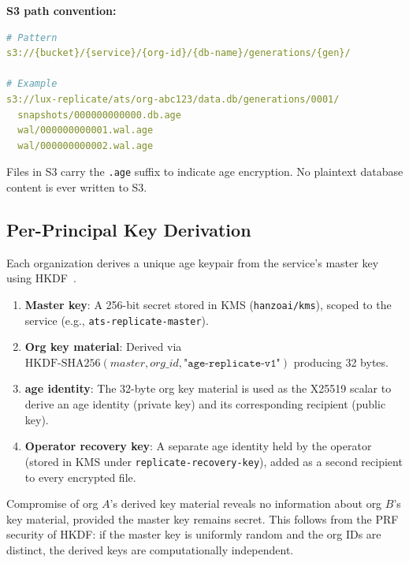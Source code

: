 \noindent\textbf{S3 path convention:}

\begin{lstlisting}[language=YAML,caption={S3 path structure.}]
# Pattern
s3://{bucket}/{service}/{org-id}/{db-name}/generations/{gen}/

# Example
s3://lux-replicate/ats/org-abc123/data.db/generations/0001/
  snapshots/000000000000.db.age
  wal/000000000001.wal.age
  wal/000000000002.wal.age
\end{lstlisting}

Files in S3 carry the \texttt{.age} suffix to indicate age encryption.
No plaintext database content is ever written to S3.

\subsection{Per-Principal Key Derivation}\label{sec:keys}

Each organization derives a unique age keypair from the service's
master key using HKDF~\cite{rfc5869}.

\begin{definition}\label{def:keyhier}
\begin{enumerate}[nosep]
  \item \textbf{Master key}: A 256-bit secret stored in KMS
    (\texttt{hanzoai/kms}), scoped to the service (e.g.,
    \texttt{ats-replicate-master}).
  \item \textbf{Org key material}: Derived via
    $\mathrm{HKDF\text{-}SHA256}(\mathit{master}, \mathit{org\_id}, \texttt{"age-replicate-v1"})$
    producing 32 bytes.
  \item \textbf{age identity}: The 32-byte org key material is used
    as the X25519 scalar to derive an age identity (private key) and
    its corresponding recipient (public key).
  \item \textbf{Operator recovery key}: A separate age identity held
    by the operator (stored in KMS under
    \texttt{replicate-recovery-key}), added as a second recipient to
    every encrypted file.
\end{enumerate}
\end{definition}

\begin{proposition}\label{prop:isolation}
Compromise of org $A$'s derived key material reveals no information
about org $B$'s key material, provided the master key remains secret.
This follows from the PRF security of HKDF: if the master key is
uniformly random and the org IDs are distinct, the derived keys are
computationally independent.
\end{proposition}

